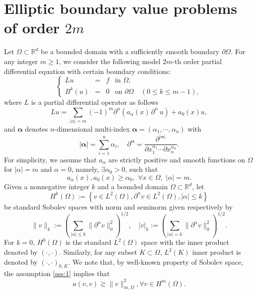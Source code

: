 \section{Elliptic boundary value problems of order $2m$}\label{sec:model}
Let $\Omega\subset \mathbb{R}^d$ be a bounded domain with a
sufficiently smooth boundary $\partial\Omega$.  For any integer $m\ge
1$, we consider the following model $2m$-th order partial differential
equation with certain boundary conditions:
\begin{equation} \label{2mPDE}
\left\{
  \begin{array}{rccl}\displaystyle
Lu &=& f &\mbox{in }\Omega, \\
B^k(u) &= &0 & \mbox{on }\partial\Omega \quad(0\le k\le m-1),
  \end{array}
\right.
\end{equation}
where $L$ is a partial differential operator as follows
\begin{equation}\label{Lu}
Lu= \sum_{|\alpha|=m}(-1)^m\partial^\alpha (a_\alpha(x)\,\partial^\alpha\,u) +a_0(x)u,
 \end{equation} 
and ${\boldsymbol{\alpha}}$ denotes $n$-dimensional multi-index ${\boldsymbol{\alpha}}
= (\alpha_1, \cdots, \alpha_n)$ with
$$
|{\boldsymbol{\alpha}}| = \sum_{i=1}^n \alpha_i, \quad
\partial^{\boldsymbol{\alpha}} = \frac{\partial^{|{\boldsymbol{\alpha}}|}}{\partial x_1^{\alpha_1}
\cdots \partial x_n^{\alpha_n}}.
$$
For simplicity, we assume that $a_\alpha$ are strictly positive and smooth functions on
$\Omega$ for  $|\alpha|=m$ and $\alpha=0$, namely, $\exists \alpha_0>0$, such that 
\begin{equation}\label{ass:1}
a_\alpha(x), a_0(x)\ge \alpha_0,\,\, \forall x\in\Omega,\,\,|\alpha|=m.
 \end{equation} 
Given a nonnegative integer
$k$ and a bounded domain $\Omega\subset \mathbb{R}^d$, let 
$$
H^k(\Omega):=\left\{v\in L^2(\Omega), \partial^\alpha v\in L^2(\Omega), |\alpha|\le k\right\}
$$
be standard Sobolev spaces with norm and seminorm given respectively by 
$$
 \|v\|_k:=\left(\sum_{|\alpha|\le k} \|\partial^\alpha v\|_0^2\right)^{1/2}, \quad  |v|_k:=\left(\sum_{|\alpha|= k} \|\partial^\alpha v\|_0^2\right)^{1/2}.
$$
For $k=0$, $H^0(\Omega)$ is the standard $L^2(\Omega)$ space
with the inner product denoted by $(\cdot, \cdot)$.  Similarly, for
any subset $K\subset \Omega$, $L^2(K)$ inner product is denoted by
$(\cdot, \cdot)_{0,K}$.  We note that, by well-known property of Sobolev space,  the assumption \eqref{ass:1} implies that
\begin{equation}
  \label{avv}
a(v,v)\gtrsim \|v\|^2_{m,\Omega}, \forall v\in H^m(\Omega).
\end{equation}

